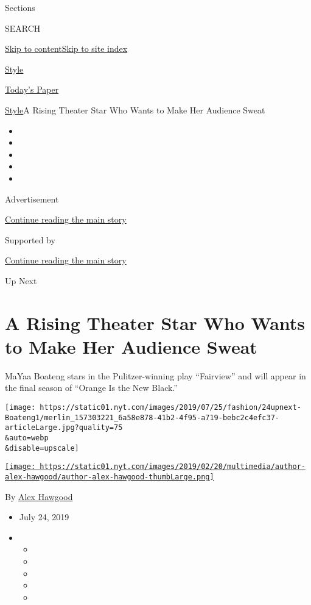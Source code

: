 Sections

SEARCH

\protect\hyperlink{site-content}{Skip to
content}\protect\hyperlink{site-index}{Skip to site index}

\href{https://www.nytimes.com/section/style}{Style}

\href{https://myaccount.nytimes.com/auth/login?response_type=cookie\&client_id=vi}{}

\href{https://www.nytimes.com/section/todayspaper}{Today's Paper}

\href{/section/style}{Style}\textbar{}A Rising Theater Star Who Wants to
Make Her Audience Sweat

\begin{itemize}
\item
\item
\item
\item
\item
\end{itemize}

Advertisement

\protect\hyperlink{after-top}{Continue reading the main story}

Supported by

\protect\hyperlink{after-sponsor}{Continue reading the main story}

Up Next

\hypertarget{a-rising-theater-star-who-wants-to-make-her-audience-sweat}{%
\section{A Rising Theater Star Who Wants to Make Her Audience
Sweat}\label{a-rising-theater-star-who-wants-to-make-her-audience-sweat}}

MaYaa Boateng stars in the Pulitzer-winning play ``Fairview'' and will
appear in the final season of ``Orange Is the New Black.''

\texttt{[image: https://static01.nyt.com/images/2019/07/25/fashion/24upnext-Boateng1/merlin\_157303221\_6a58e878-41b2-4f95-a719-bebc2c4efc37-articleLarge.jpg?quality=75\\\&auto=webp\\\&disable=upscale]}

\href{https://www.nytimes.com/by/alex-hawgood}{\texttt{[image: https://static01.nyt.com/images/2019/02/20/multimedia/author-alex-hawgood/author-alex-hawgood-thumbLarge.png]}}

By \href{https://www.nytimes.com/by/alex-hawgood}{Alex Hawgood}

\begin{itemize}
\item
  July 24, 2019
\item
  \begin{itemize}
  \item
  \item
  \item
  \item
  \item
  \end{itemize}
\end{itemize}

